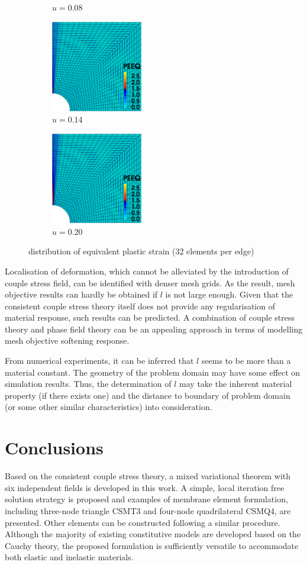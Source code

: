 \documentclass[3p,sort&compress,11pt,fleqn]{elsarticle}
\begin{document}
\begin{figure}[ht]
\begin{subfigure}[b]{.33\textwidth}
\caption{$u=\num{0.08}$}
\end{subfigure}\hfill
\begin{subfigure}[b]{.33\textwidth}\centering
\includegraphics[width=4cm]{PIC/P3270}
\caption{$u=\num{0.14}$}
\end{subfigure}\hfill
\begin{subfigure}[b]{.33\textwidth}\centering
\includegraphics[width=4cm]{PIC/P32100}
\caption{$u=\num{0.20}$}
\end{subfigure}
\caption{distribution of equivalent plastic strain (32 elements per edge)}\label{fig:peeq32}
\end{figure}
Localisation of deformation, which cannot be alleviated by the introduction of couple stress field, can be identified with denser mesh grids. As the result, mesh objective results can hardly be obtained if $l$ is not large enough. Given that the consistent couple stress theory itself does not provide any regularisation of material response, such results can be predicted. A combination of couple stress theory and phase field theory \citep{Bourdin2008} can be an appealing approach in terms of modelling mesh objective softening response.

From numerical experiments, it can be inferred that $l$ seems to be more than a material constant. The geometry of the problem domain may have some effect on simulation results. Thus, the determination of $l$ may take the inherent material property (if there exists one) and the distance to boundary of problem domain (or some other similar characteristics) into consideration.
\section{Conclusions}
Based on the consistent couple stress theory, a mixed variational theorem with six independent fields is developed in this work. A simple, local iteration free solution strategy is proposed and examples of membrane element formulation, including three-node triangle CSMT3 and four-node quadrilateral CSMQ4, are presented. Other elements can be constructed following a similar procedure. Although the majority of existing constitutive models are developed based on the Cauchy theory, the proposed formulation is sufficiently versatile to accommodate both elastic and inelastic materials.
\end{document}
